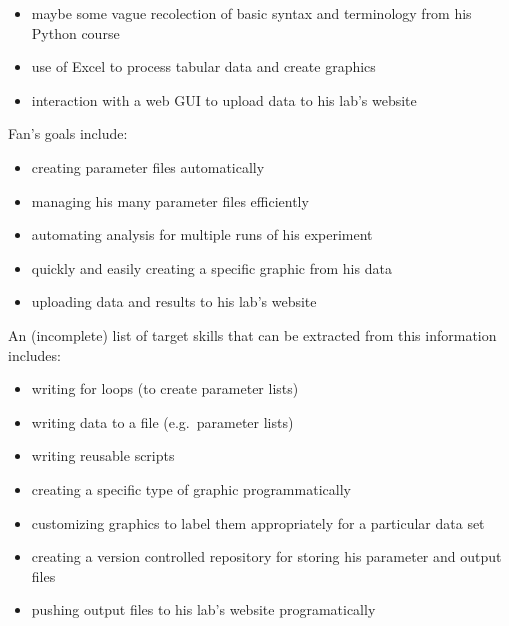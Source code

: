 \documentclass[]{book}
\providecommand{\tightlist}{%
  \setlength{\itemsep}{0pt}\setlength{\parskip}{0pt}}
\begin{document}
\begin{itemize}
\tightlist
\item
  maybe some vague recolection of basic syntax and terminology from his Python
  course
\item
  use of Excel to process tabular data and create graphics
\item
  interaction with a web GUI to upload data to his lab's website
\end{itemize}

Fan's goals include:

\begin{itemize}
\tightlist
\item
  creating parameter files automatically
\item
  managing his many parameter files efficiently
\item
  automating analysis for multiple runs of his experiment
\item
  quickly and easily creating a specific graphic from his data
\item
  uploading data and results to his lab's website
\end{itemize}

An (incomplete) list of target skills that can be extracted from this information includes:

\begin{itemize}
\tightlist
\item
  writing for loops (to create parameter lists)
\item
  writing data to a file (e.g.~parameter lists)
\item
  writing reusable scripts
\item
  creating a specific type of graphic programmatically
\item
  customizing graphics to label them appropriately for a particular data set
\item
  creating a version controlled repository for storing his parameter and output
  files
\item
  pushing output files to his lab's website programatically
\end{itemize}
\end{document}
